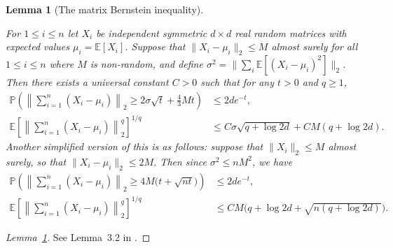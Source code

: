 \documentclass[11pt,lof]{puthesis}
\renewcommand{\P}{\ensuremath{\mathbb{P}}}
\newcommand{\E}{\ensuremath{\mathbb{E}}}
\theoremstyle{break}
\newtheorem{lemma}{Lemma}[section]
\theoremstyle{proof}
\newtheorem{proof}{Proof}
\begin{document}
\begin{lemma}[The matrix Bernstein inequality]
\label{lem:kernel_app_matrix_bernstein}

For $1 \leq i \leq n$
let $X_i$ be independent symmetric $d \times d$
real random matrices
with expected values $\mu_i = \E[X_i]$.
Suppose that
$\|X_i - \mu_i\|_2 \leq M$
almost surely for all $1 \leq i \leq n$
where $M$ is non-random, and define
$\sigma^2 = \big\| \sum_i \E[(X_i - \mu_i)^2] \big\|_2$.
Then there exists a universal constant $C > 0$
such that
for any $t > 0$ and $q \geq 1$,
%
\begin{align*}
\P\left(
\left\|
\sum_{i=1}^n
\left(
X_i - \mu_i
\right)
\right\|_2
\geq
2 \sigma \sqrt{t}
+ \frac{4}{3} M t
\right)
&\leq
2 d e^{-t}, \\
\E\left[
\left\|
\sum_{i=1}^n
\left(
X_i - \mu_i
\right)
\right\|_2^q
\right]^{1/q}
&\leq
C \sigma \sqrt{q + \log 2d}
+ C M (q + \log 2d).
\end{align*}
%
Another simplified version of this is as follows:
suppose that
$\|X_i\|_2 \leq M$ almost surely,
so that
$\|X_i - \mu_i\|_2 \leq 2M$.
Then since
$\sigma^2 \leq n M^2$,
we have
%
\begin{align*}
\P\left(
\left\|
\sum_{i=1}^n
\left(
X_i - \mu_i
\right)
\right\|_2
\geq
4M \big(t + \sqrt{n t}\big)
\right)
&\leq
2 d e^{-t}, \\
\E\left[
\left\|
\sum_{i=1}^n
\left(
X_i - \mu_i
\right)
\right\|_2^q
\right]^{1/q}
&\leq
C M
\big(q + \log 2d + \sqrt{n(q + \log 2d)}\big).
\end{align*}

\end{lemma}

\begin{proof}[Lemma~\ref{lem:kernel_app_matrix_bernstein}]

See Lemma~3.2 in \citet{minsker2019moment}.
\end{proof}
\end{document}
